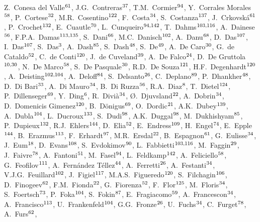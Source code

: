 \begin{flushleft}
Z.~Conesa del Valle$^{\rm 61}$, 
J.G.~Contreras$^{\rm 37}$, 
T.M.~Cormier$^{\rm 94}$, 
Y.~Corrales Morales$^{\rm 58}$, 
P.~Cortese$^{\rm 32}$, 
M.R.~Cosentino$^{\rm 122}$, 
F.~Costa$^{\rm 34}$, 
S.~Costanza$^{\rm 137}$, 
J.~Crkovsk\'{a}$^{\rm 61}$, 
P.~Crochet$^{\rm 132}$, 
E.~Cuautle$^{\rm 70}$, 
L.~Cunqueiro$^{\rm 94,142}$, 
T.~Dahms$^{\rm 103,116}$, 
A.~Dainese$^{\rm 56}$, 
F.P.A.~Damas$^{\rm 113,135}$, 
S.~Dani$^{\rm 66}$, 
M.C.~Danisch$^{\rm 102}$, 
A.~Danu$^{\rm 68}$, 
D.~Das$^{\rm 107}$, 
I.~Das$^{\rm 107}$, 
S.~Das$^{\rm 3}$, 
A.~Dash$^{\rm 85}$, 
S.~Dash$^{\rm 48}$, 
S.~De$^{\rm 49}$, 
A.~De Caro$^{\rm 30}$, 
G.~de Cataldo$^{\rm 52}$, 
C.~de Conti$^{\rm 120}$, 
J.~de Cuveland$^{\rm 39}$, 
A.~De Falco$^{\rm 24}$, 
D.~De Gruttola$^{\rm 10,30}$, 
N.~De Marco$^{\rm 58}$, 
S.~De Pasquale$^{\rm 30}$, 
R.D.~De Souza$^{\rm 121}$, 
H.F.~Degenhardt$^{\rm 120}$, 
A.~Deisting$^{\rm 102,104}$, 
A.~Deloff$^{\rm 84}$, 
S.~Delsanto$^{\rm 26}$, 
C.~Deplano$^{\rm 89}$, 
P.~Dhankher$^{\rm 48}$, 
D.~Di Bari$^{\rm 33}$, 
A.~Di Mauro$^{\rm 34}$, 
B.~Di Ruzza$^{\rm 56}$, 
R.A.~Diaz$^{\rm 8}$, 
T.~Dietel$^{\rm 124}$, 
P.~Dillenseger$^{\rm 69}$, 
Y.~Ding$^{\rm 6}$, 
R.~Divi\`{a}$^{\rm 34}$, 
{\O}.~Djuvsland$^{\rm 22}$, 
A.~Dobrin$^{\rm 34}$, 
D.~Domenicis Gimenez$^{\rm 120}$, 
B.~D\"{o}nigus$^{\rm 69}$, 
O.~Dordic$^{\rm 21}$, 
A.K.~Dubey$^{\rm 139}$, 
A.~Dubla$^{\rm 104}$, 
L.~Ducroux$^{\rm 133}$, 
S.~Dudi$^{\rm 98}$, 
A.K.~Duggal$^{\rm 98}$, 
M.~Dukhishyam$^{\rm 85}$, 
P.~Dupieux$^{\rm 132}$, 
R.J.~Ehlers$^{\rm 144}$, 
D.~Elia$^{\rm 52}$, 
E.~Endress$^{\rm 109}$, 
H.~Engel$^{\rm 74}$, 
E.~Epple$^{\rm 144}$, 
B.~Erazmus$^{\rm 113}$, 
F.~Erhardt$^{\rm 97}$, 
M.R.~Ersdal$^{\rm 22}$, 
B.~Espagnon$^{\rm 61}$, 
G.~Eulisse$^{\rm 34}$, 
J.~Eum$^{\rm 18}$, 
D.~Evans$^{\rm 108}$, 
S.~Evdokimov$^{\rm 90}$, 
L.~Fabbietti$^{\rm 103,116}$, 
M.~Faggin$^{\rm 29}$, 
J.~Faivre$^{\rm 78}$, 
A.~Fantoni$^{\rm 51}$, 
M.~Fasel$^{\rm 94}$, 
L.~Feldkamp$^{\rm 142}$, 
A.~Feliciello$^{\rm 58}$, 
G.~Feofilov$^{\rm 111}$, 
A.~Fern\'{a}ndez T\'{e}llez$^{\rm 44}$, 
A.~Ferretti$^{\rm 26}$, 
A.~Festanti$^{\rm 34}$, 
V.J.G.~Feuillard$^{\rm 102}$, 
J.~Figiel$^{\rm 117}$, 
M.A.S.~Figueredo$^{\rm 120}$, 
S.~Filchagin$^{\rm 106}$, 
D.~Finogeev$^{\rm 62}$, 
F.M.~Fionda$^{\rm 22}$, 
G.~Fiorenza$^{\rm 52}$, 
F.~Flor$^{\rm 125}$, 
M.~Floris$^{\rm 34}$, 
S.~Foertsch$^{\rm 73}$, 
P.~Foka$^{\rm 104}$, 
S.~Fokin$^{\rm 87}$, 
E.~Fragiacomo$^{\rm 59}$, 
A.~Francescon$^{\rm 34}$, 
A.~Francisco$^{\rm 113}$, 
U.~Frankenfeld$^{\rm 104}$, 
G.G.~Fronze$^{\rm 26}$, 
U.~Fuchs$^{\rm 34}$, 
C.~Furget$^{\rm 78}$, 
A.~Furs$^{\rm 62}$, 

\end{flushleft}

